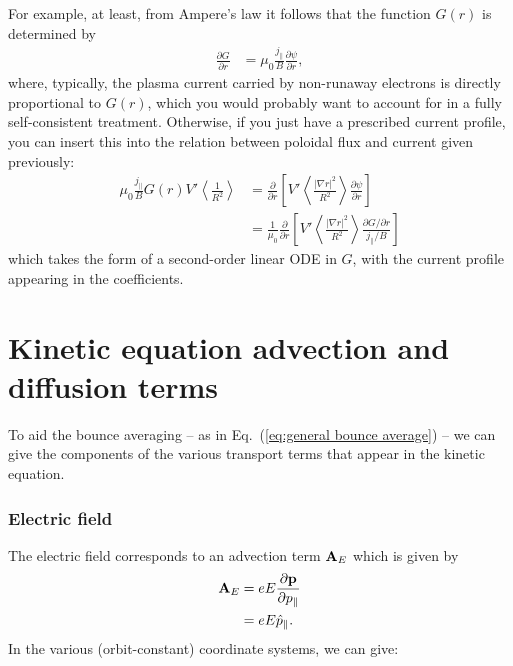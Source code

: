 \documentclass[11pt,a4paper]{article}
\newcommand{\rd}{\ensuremath{\mathrm{d}}}
\renewcommand{\b}[1]{\ensuremath{ {\bf #1 } }}
\begin{document}
For example, at least, from Ampere's law it follows that the function $G(r)$ is determined by
\begin{align}
\frac{\partial G}{\partial r} &= \mu_0\frac{j_\parallel}{B}\frac{\partial \psi}{\partial r},
\end{align}
where, typically, the plasma current carried by non-runaway electrons is directly proportional to $G(r)$, which you would probably want to account for in a fully self-consistent treatment. Otherwise, if you just have a prescribed current profile, you can insert this into the relation between poloidal flux and current given previously:
\begin{align}
\mu_0 \frac{j_\parallel}{B} G(r) V'\left\langle \frac{1}{R^2}\right\rangle &= \frac{\partial }{\partial r}\left[V'\left\langle \frac{|\nabla r|^2}{R^2}\right\rangle \frac{\partial \psi}{\partial r}\right] \nonumber \\
&=\frac{1}{\mu_0}\frac{\partial }{\partial r}\left[V'\left\langle \frac{|\nabla r|^2}{R^2}\right\rangle \frac{\partial G/\partial r}{j_\parallel/B}\right] 
\end{align}
which takes the form of a second-order linear ODE in $G$, with the current profile appearing in the coefficients.

\newpage
\appendix

\section{Kinetic equation advection and diffusion terms}
\label{app:kinetic equation terms}
To aid the bounce averaging -- as in Eq.~(\ref{eq:general bounce average}) -- we can give the components of the various transport terms that appear in the kinetic equation.

\subsubsection*{Electric field}
The electric field corresponds to an advection term $\b{A}_E$ which is given by 
\begin{align}
\b{A}_E &= eE \frac{\partial \b{p}}{\partial p_\parallel}  \nonumber \\
&=eE \hat{p}_\parallel.
\end{align}
In the various (orbit-constant) coordinate systems, we can give:
\end{document}
